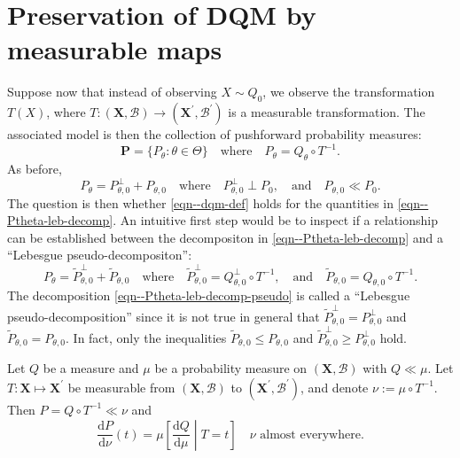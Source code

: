
\section{Preservation of DQM by measurable maps}
\label{sec--dqm-and-meas-maps}

Suppose now that instead of observing \(X \sim Q_{0}\), we observe the
transformation \(T (X)\), where \(T : (\mathbf{X}, \mathcal{B}) \to \left(
\mathbf{X}^{\prime}, \mathcal{B}^{\prime} \right)\) is a measurable
transformation.
The associated model is then the collection of pushforward probability measures:
\begin{equation}
  \mathbf{P} = \{ P_{\theta} : \theta \in \Theta\} \quad \text{where} \quad
  P_{\theta} = Q_{\theta} \circ T^{- 1}.
  \label{eqn--P-T-def}
\end{equation}
As before,
\begin{equation}
  P_{\theta} =  P_{\theta, 0}^{\perp} + P_{\theta, 0}
  \quad \text{where} \quad
  P_{\theta, 0}^{\perp} \perp P_{0},
  \quad \text{and} \quad
  P_{\theta, 0} \ll P_{0}.
  \label{eqn--Ptheta-leb-decomp}
\end{equation}
The question is then whether \eqref{eqn--dqm-def} holds for the quantities in
\eqref{eqn--Ptheta-leb-decomp}.
An intuitive first step would be to inspect if a relationship can be established
between the decompositon in \eqref{eqn--Ptheta-leb-decomp}
and a ``Lebesgue pseudo-decompositon'':
\begin{equation}
  P_{\theta} = \tilde{P}_{\theta, 0}^{\perp} + \tilde{P}_{\theta, 0}
  \quad \text{where} \quad
  \tilde{P}_{\theta, 0}^{\perp} = Q_{\theta, 0}^{\perp} \circ T^{- 1},
  \quad \text{and} \quad
  \tilde{P}_{\theta, 0} = Q_{\theta, 0} \circ T^{- 1}.
  \label{eqn--Ptheta-leb-decomp-pseudo}
\end{equation}
The decomposition \eqref{eqn--Ptheta-leb-decomp-pseudo} is called a ``Lebesgue
pseudo-decomposition'' since it is not true in general that \(\tilde{P}_{\theta,
0}^{\perp} = P_{\theta, 0}^{\perp}\) and \(\tilde{P}_{\theta, 0} = P_{\theta,
0}\).
In fact, only the inequalities
\(\tilde{P}_{\theta, 0} \leq P_{\theta, 0}\) and
\(\tilde{P}_{\theta, 0}^{\perp} \geq P_{\theta, 0}^{\perp}\) hold.

\begin{lemma}
\label{lem--density-preservation}
Let \(Q\) be a measure and \(\mu\) be a probability measure on \((\mathbf{X},
\mathcal{B})\) with \(Q \ll \mu\).
Let \(T : \mathbf{X} \mapsto \mathbf{X}^{\prime}\) be measurable from
\((\mathbf{X}, \mathcal{B})\) to \(\left( \mathbf{X}^{\prime},
\mathcal{B}^{\prime} \right)\), and denote \(\nu := \mu \circ T^{- 1}\).
Then \(P = Q \circ T^{- 1} \ll \nu\) and
\begin{equation}
  \frac{\mathrm{d} P}{\mathrm{d} \nu} (t) = \mu \left[ \frac{\mathrm{d}
  Q}{\mathrm{d} \mu} \middle| T = t \right] \quad \nu \text{ almost everywhere}.
  \label{eqn--density-preservation}
\end{equation}
\end{lemma}

